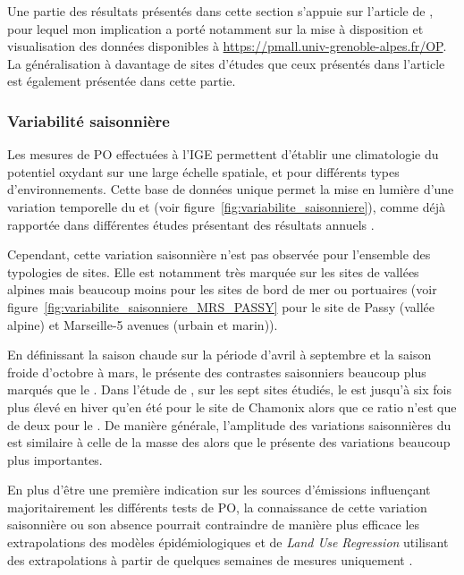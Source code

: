 \begin{tcolorbox}[colback=red!5!white,colframe=Melon,title=Note]
    Une partie des résultats présentés dans cette section s'appuie sur l'article de
    \cite{calasSeasonal2019}, pour lequel mon implication a porté notamment sur la mise à
    disposition et visualisation des données disponibles à
    \url{https://pmall.univ-grenoble-alpes.fr/OP}.\\
    La généralisation à davantage de sites d'études que ceux présentés dans l'article est
    également présentée dans cette partie.
\end{tcolorbox}

\subsubsection{Variabilité saisonnière}%
\label{ssub:variabilité_saisonnière}

Les mesures de PO effectuées à l'IGE permettent d'établir une climatologie du potentiel
oxydant sur une large échelle spatiale, et pour différents types d'environnements. Cette
base de données unique permet la mise en lumière d'une variation temporelle du \POAAv{} et
\PODTTv{} (voir figure~\ref{fig:variabilite_saisonniere}), comme déjà rapportée dans
différentes études présentant des résultats annuels
\autocite{fangOxidative2016,calasComparison2018,calasSeasonal2019,pietrograndePM102018}.

Cependant, cette variation saisonnière n'est pas observée pour l'ensemble des typologies
de sites. Elle est notamment très marquée sur les sites de vallées alpines mais beaucoup
moins pour les sites de bord de mer ou portuaires (voir
figure~\ref{fig:variabilite_saisonniere_MRS_PASSY} pour le site de Passy (vallée alpine)
et Marseille-5 avenues (urbain et marin)).

En définissant la saison chaude sur la période d'avril à septembre et la saison froide
d'octobre à mars, le \POAAv{} présente des contrastes saisonniers beaucoup plus marqués que
le \PODTTv. Dans l'étude de \cite[tableau 3]{calasSeasonal2019}, sur les sept sites étudiés,
le \POAAv{} est jusqu'à six fois plus élevé en hiver qu'en été pour le site de Chamonix
alors que ce ratio n'est que de deux pour le \PODTTv. De manière générale, l'amplitude des
variations saisonnières du \PODTTv{} est similaire à celle de la masse des \PMdix{} alors
que le \POAAv{} présente des variations beaucoup plus importantes.

En plus d'être une première indication sur les sources d'émissions influençant
majoritairement les différents tests de PO, la connaissance de cette variation saisonnière
ou son absence pourrait contraindre de manière plus efficace les extrapolations des
modèles épidémiologiques et de \textit{Land Use Regression} utilisant des extrapolations à
partir de quelques semaines de mesures uniquement
\autocite{yangSpatial2015,jedynskaSpatial2017}.

